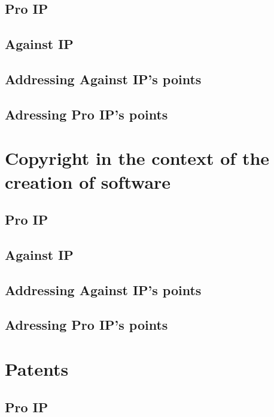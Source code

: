 \documentclass[a4paper]{report}
\begin{document}
\subsection{Pro IP}

\subsection{Against IP}

\subsection{Addressing Against IP's points}

\subsection{Adressing Pro IP's points}

\section{Copyright in the context of the creation of software}
\label{sec:CopySoft}

\subsection{Pro IP}

\subsection{Against IP}

\subsection{Addressing Against IP's points}

\subsection{Adressing Pro IP's points}

\section{Patents}
\label{sec:DiscPatents}

\subsection{Pro IP}
\end{document}
